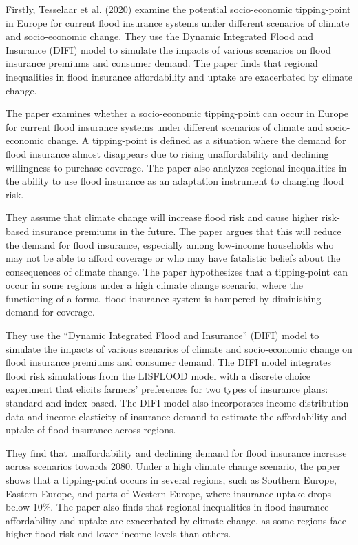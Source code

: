 \documentclass[a4paper,12pt]{article}
\begin{document}
Firstly, Tesselaar et al. (2020) examine the potential socio-economic tipping-point in Europe for current flood insurance systems under different scenarios of climate and socio-economic change. They use the Dynamic Integrated Flood and Insurance (DIFI) model to simulate the impacts of various scenarios on flood insurance premiums and consumer demand. The paper finds that regional inequalities in flood insurance affordability and uptake are exacerbated by climate change.

The paper examines whether a socio-economic tipping-point can occur in Europe for current flood insurance systems under different scenarios of climate and socio-economic change. A tipping-point is defined as a situation where the demand for flood insurance almost disappears due to rising unaffordability and declining willingness to purchase coverage. The paper also analyzes regional inequalities in the ability to use flood insurance as an adaptation instrument to changing flood risk.

They assume that climate change will increase flood risk and cause higher risk-based insurance premiums in the future. The paper argues that this will reduce the demand for flood insurance, especially among low-income households who may not be able to afford coverage or who may have fatalistic beliefs about the consequences of climate change. The paper hypothesizes that a tipping-point can occur in some regions under a high climate change scenario, where the functioning of a formal flood insurance system is hampered by diminishing demand for coverage.

They use the “Dynamic Integrated Flood and Insurance” (DIFI) model to simulate the impacts of various scenarios of climate and socio-economic change on flood insurance premiums and consumer demand. The DIFI model integrates flood risk simulations from the LISFLOOD model with a discrete choice experiment that elicits farmers’ preferences for two types of insurance plans: standard and index-based. The DIFI model also incorporates income distribution data and income elasticity of insurance demand to estimate the affordability and uptake of flood insurance across regions.

They find that unaffordability and declining demand for flood insurance increase across scenarios towards 2080. Under a high climate change scenario, the paper shows that a tipping-point occurs in several regions, such as Southern Europe, Eastern Europe, and parts of Western Europe, where insurance uptake drops below 10\%. The paper also finds that regional inequalities in flood insurance affordability and uptake are exacerbated by climate change, as some regions face higher flood risk and lower income levels than others.
\end{document}
